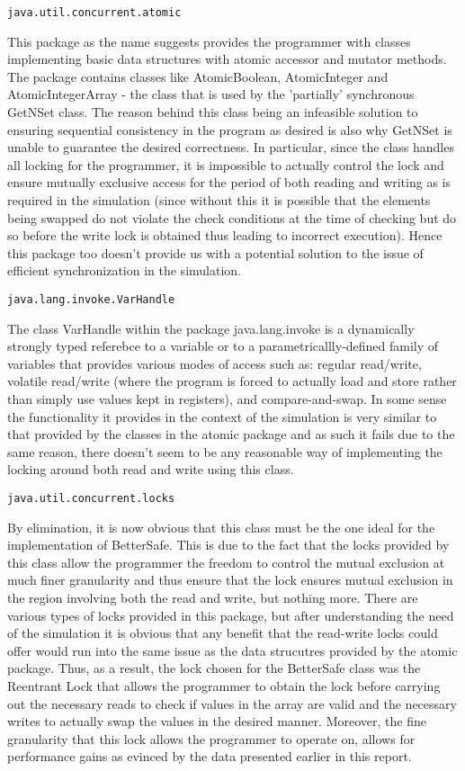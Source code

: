 \begin{verbatim}
java.util.concurrent.atomic
\end{verbatim}
This package as the name suggests provides the programmer with classes implementing basic data structures with atomic accessor and mutator methods. The package contains classes like AtomicBoolean, AtomicInteger and AtomicIntegerArray - the class that is used by the 'partially' synchronous GetNSet class. The reason behind this class being an infeasible solution to ensuring sequential consistency in the program as desired is also why GetNSet is unable to guarantee the desired correctness. In particular, since the class handles all locking for the programmer, it is impossible to actually control the lock and ensure mutually exclusive access for the period of both reading and writing as is required in the simulation (since without this it is possible that the elements being swapped do not violate the check conditions at the time of checking but do so before the write lock is obtained thus leading to incorrect execution). 
Hence this package too doesn't provide us with a potential solution to the issue of efficient synchronization in the simulation. 

\begin{verbatim}
java.lang.invoke.VarHandle
\end{verbatim}
The class VarHandle within the package java.lang.invoke is a dynamically strongly typed referebce to a variable or to a parametricallly-defined family of variables that provides various modes of access such as: regular read/write, volatile read/write (where the program is forced to actually load and store rather than simply use values kept in registers), and compare-and-swap. In some sense the functionality it provides in the context of the simulation is very similar to that provided by the classes in the atomic package and as such it fails due to the same reason, there doesn't seem to be any reasonable way of implementing the locking around both read and write using this class. 

\begin{verbatim}
java.util.concurrent.locks
\end{verbatim}
By elimination, it is now obvious that this class must be the one ideal for the implementation of BetterSafe. This is due to the fact that the locks provided by this class allow the programmer the freedom to control the mutual exclusion at much finer granularity and thus ensure that the lock ensures mutual exclusion in the region involving both the read and write, but nothing more. 
There are various types of locks provided in this package, but after understanding the need of the simulation it is obvious that any benefit that the read-write locks could offer would run into the same issue as the data strucutres provided by the atomic package. Thus, as a result, the lock chosen for the BetterSafe class was the Reentrant Lock that allows the programmer to obtain the lock before carrying out the necessary reads to check if values in the array are valid and the necessary writes to actually swap the values in the desired manner. 
Moreover, the fine granularity that this lock allows the programmer to operate on, allows for performance gains as evinced by the data presented earlier in this report. 

